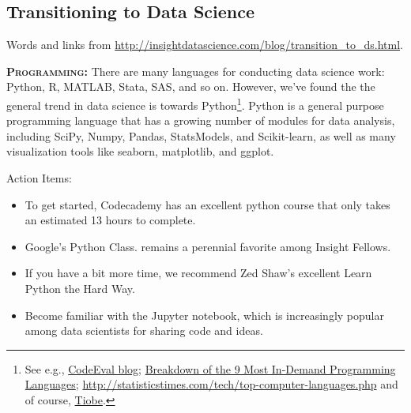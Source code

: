 \documentclass[11pt,a4paper]{article}
\begin{document}
\subsection*{Transitioning to Data Science}
\noindent
Words and links from \href{http://insightdatascience.com/blog/transition\_to\_ds.html}{http://insightdatascience.com/blog/transition\_to\_ds.html}. 

\smallskip
\smallskip
\noindent
\textbf{\textsc{Programming:}}
There are many languages for conducting data science work: Python, R,
MATLAB, Stata, SAS, and so on. However, we've found the the general
trend in data science is towards Python\footnote{See e.g.,
\href{http://blog.codeeval.com/codeevalblog/2015\#.V5qxlpMrKRs}{CodeEval blog};
\href{http://www.codingdojo.com/blog/9-most-in-demand-programming-languages-of-2016/}{Breakdown
of the 9 Most In-Demand Programming Languages}; 
\href{http://statisticstimes.com/tech/top-computer-languages.php}{http://statisticstimes.com/tech/top-computer-languages.php} and of course, 
\href{http://www.tiobe.com/tiobe_index}{Tiobe}.}.
Python is a general purpose programming language that has a growing
number of modules for data analysis, including SciPy, Numpy, Pandas,
StatsModels, and Scikit-learn, as well as many visualization tools
like seaborn, matplotlib, and ggplot.

\smallskip
\smallskip
\noindent
Action Items:
\begin{itemize}
\item{To get started, Codecademy has an excellent python course that only
takes an estimated 13 hours to complete.}  
\item{Google's Python Class. remains a perennial favorite among Insight Fellows.}
\item{If you have a bit more time, we recommend Zed Shaw's excellent Learn Python the Hard Way.}
\item{Become familiar with the Jupyter notebook, which is increasingly popular among data scientists for sharing code and ideas.}
\end{itemize}
\end{document}
